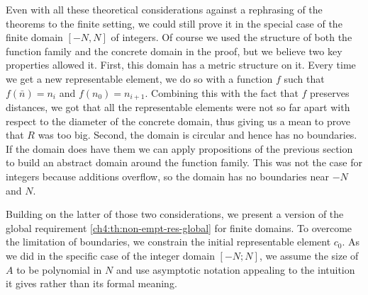 Even with all these theoretical considerations against a rephrasing of the theorems to the finite setting, we could still prove it in the special case of the finite domain $[-N, N]$ of integers. Of course we used the structure of both the function family and the concrete domain in the proof, but we believe two key properties allowed it.
First, this domain has a metric structure on it. Every time we get a new representable element, we do so with a function $f$ such that $f(\bar{n}) = n_i$ and $f(n_0) = n_{i+1}$. Combining this with the fact that $f$ preserves distances, we got that all the representable elements were not so far apart with respect to the diameter of the concrete domain, thus giving us a mean to prove that $R$ was too big.
Second, the domain is circular and hence has no boundaries. If the domain does have them we can apply propositions of the previous section to build an abstract domain around the function family. This was not the case for integers because additions overflow, so the domain has no boundaries near $-N$ and $N$.

Building on the latter of those two considerations, we present a version of the global requirement \ref{ch4:th:non-empt-res-global} for finite domains. To overcome the limitation of boundaries, we constrain the initial representable element $c_0$. As we did in the specific case of the integer domain $[-N; N]$, we assume the size of $A$ to be polynomial in $N$ and use asymptotic notation appealing to the intuition it gives rather than its formal meaning.

